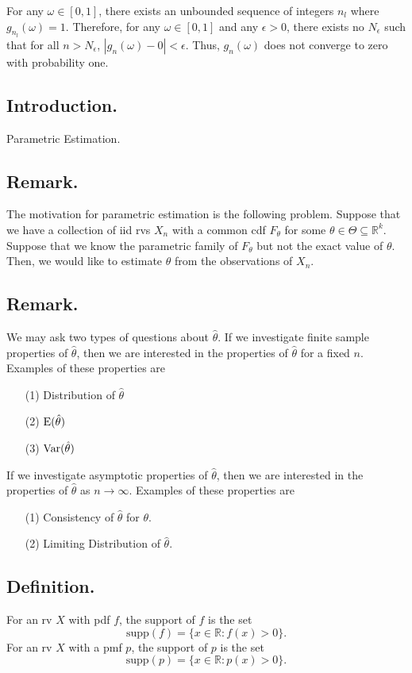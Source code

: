 \documentclass[titlepage]{article}
\begin{document}
For any $\omega \in [0, 1]$, there exists an unbounded sequence of integers $n_{l}$ where $g_{n_{l}}(\omega) = 1$. Therefore, for any $\omega \in [0, 1]$ and any $\epsilon > 0$, there exists no $N_{\epsilon}$ such that for all $n > N_{\epsilon}$, $|g_{n}(\omega) - 0| < \epsilon$. Thus, $g_{n}(\omega)$ does not converge to zero with probability one.

\newpage {}

\subsection{Introduction.} Parametric Estimation.

\subsection{Remark.} The motivation for parametric estimation is the following problem. Suppose that we have a collection of iid rvs $X_{n}$ with a common cdf $F_{\theta}$ for some $\theta \in \Theta \subseteq \mathbb{R}^{k}$. Suppose that we know the parametric family of $F_{\theta}$ but not the exact value of $\theta$. Then, we would like to estimate $\theta$ from the observations of $X_{n}$.

\subsection{Remark.} We may ask two types of questions about $\hat{\theta}$. If we investigate finite sample properties of $\hat{\theta}$, then we are interested in the properties of $\hat{\theta}$ for a fixed $n$. Examples of these properties are 
\begin{enumerate}
\item[(1)] Distribution of $\hat{\theta}$
\item[(2)] $\text{E}(\hat{\theta})$
\item[(3)] $\text{Var}(\hat{\theta})$
\end{enumerate}
If we investigate asymptotic properties of $\hat{\theta}$, then we are interested in the properties of $\hat{\theta}$ as $n \to \infty$. Examples of these properties are 
\begin{enumerate}
\item[(1)] Consistency of $\hat{\theta}$ for $\theta$.
\item[(2)] Limiting Distribution of $\hat{\theta}$.
\end{enumerate}

\subsection{Definition.} For an rv $X$ with pdf $f$, the support of $f$ is the set 
$$\text{supp}(f) = \{x \in \mathbb{R}: f(x) > 0\}.$$
For an rv $X$ with a pmf $p$, the support of $p$ is the set
$$\text{supp}(p) = \{x \in \mathbb{R}: p(x) > 0\}.$$
\end{document}
